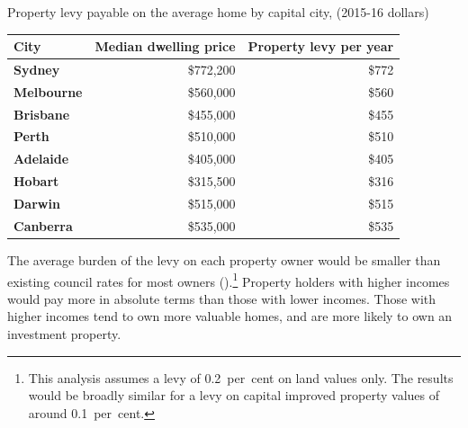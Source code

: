 \documentclass[twoside,english]{Dianab5ona4portrait}
\begin{document}
\begin{table}[h]
%
{Property levy payable on the average home by capital city, (2015-16 dollars)}
\begin{tabularx}{\columnwidth}{lRR}
\toprule
\textbf{City} & {\textbf{Median dwelling price}} & \textbf{Property levy per year} \\
\midrule
\textbf{Sydney} & {\$772,200} & \$772 \\
\textbf{Melbourne} & {\$560,000} & \$560 \\
\textbf{Brisbane} & {\$455,000} & \$455 \\
\textbf{Perth} & {\$510,000} & \$510 \\
\textbf{Adelaide} & {\$405,000} & \$405 \\
\textbf{Hobart} & {\$315,500} & \$316 \\
\textbf{Darwin} & {\$515,000} & \$515 \\
\textbf{Canberra} & {\$535,000} & \$535 \\
\bottomrule
\end{tabularx}

\end{table}

The average burden of the levy on each property owner would be
smaller than existing council rates for most owners ().\footnote{This analysis assumes a levy of 0.2~per~cent on land values only. The results
would be broadly similar for a levy on capital improved property values of around
0.1~per~cent.}
Property holders with higher incomes would pay more in absolute
terms than those with lower incomes. Those with higher incomes
tend to own more valuable homes, and are more likely to own an
investment property.
\end{document}
